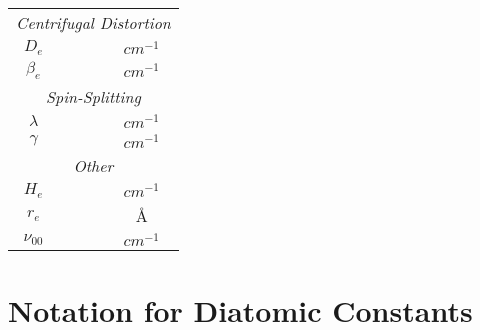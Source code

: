 \documentclass[11pt, twoside, fleqn]{report}
\begin{document}
\begin{table}[H]
\begin{tabular}{cccc}
        \multicolumn{4}{c}{\textit{Centrifugal Distortion}}                                    \\
        \cmidrule(lr){1-4}
        $D_e$         &                           &                         & $\unit{cm^{-1}}$ \\
        $\beta_e$     &                           &                         & $\unit{cm^{-1}}$ \\
        \multicolumn{4}{c}{\textit{Spin-Splitting}}                                            \\
        \cmidrule(lr){1-4}
        $\lambda$     &                           &                         & $\unit{cm^{-1}}$ \\
        $\gamma$      &                           &                         & $\unit{cm^{-1}}$ \\
        \multicolumn{4}{c}{\textit{Other}}                                                     \\
        \cmidrule(lr){1-4}
        $H_e$         &                           &                         & $\unit{cm^{-1}}$ \\
        $r_e$         &                           &                         & \AA              \\
        $\nu_{00}$    &                           &                         & $\unit{cm^{-1}}$ \\
        \bottomrule
    \end{tabular}
\end{table}

\chapter{Notation for Diatomic Constants}
\label{a:notation_for_diatomic_constants}
\end{document}
